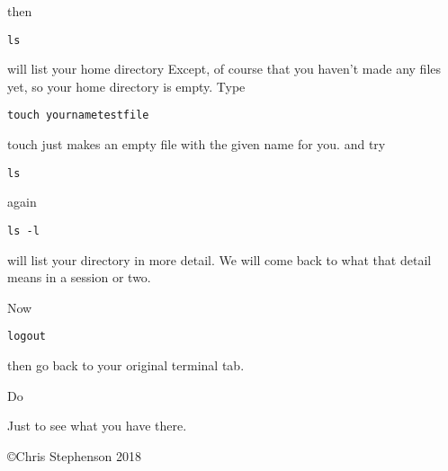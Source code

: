 \documentclass[12pt,a4paper]{article}
\begin{document}
then
\begin{lstlisting}
ls
\end{lstlisting}
will list your home directory
Except, of course that you haven’t made any files yet, so your home directory is empty. 
Type
\begin{lstlisting}
touch yournametestfile
\end{lstlisting}
touch just makes an empty file with the given name for you.
and try
\begin{lstlisting}
ls
\end{lstlisting}
again
\begin{lstlisting}
ls -l
\end{lstlisting}
will list your directory in more detail. We will come back to what that detail means in a session or two. 

Now 
\begin{lstlisting} 
logout
\end{lstlisting}

then go back to your original terminal tab.

Do 


Just to see what you have there.

\vspace{4cm}

\copyright Chris Stephenson 2018
\end{document}
